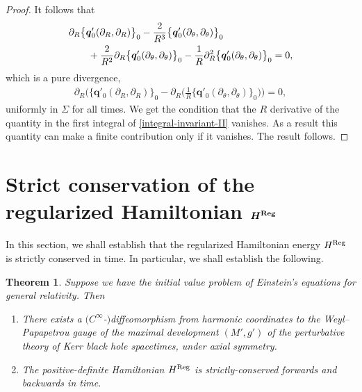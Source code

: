 \documentclass[pdftex]{sigma}
\def\ptl{\partial}%
\def\mbo#1{\boldsymbol{#1}}%
\numberwithin{equation}{section}
\newtheorem{Theorem}{Theorem}[section]
\begin{document}
\begin{proof}
It follows that
\begin{align*}
&\ptl_R \bigl\{ \mbo{q}'_0 (\ptl_R, \ptl_R) \bigr\}_0 - \frac{2}{R^3} \bigl\{ \mbo{q}'_0 (\ptl_\theta, \ptl_\theta) \bigr\}_0 \notag\\
& \qquad{} + \frac{2}{R^2} \ptl_R \bigl\{ \mbo{q}'_0 (\ptl_\theta, \ptl_\theta) \bigr\}_0 -
\frac{1}{R} \ptl^2_R \bigl\{ \mbo{q}'_0 (\ptl_\theta, \ptl_\theta) \bigr\}_0 =0,
\end{align*}
which is a pure divergence,
\begin{align*}
\ptl_R \biggl(\bigl\{ \mbo{q}'_0 (\ptl_R, \ptl_R) \bigr\}_0 - \ptl_R \biggl( \frac{1}{R} \bigl\{ \mbo{q}'_0 (\ptl_\theta, \ptl_\theta) \bigr\}_0 \biggr) \biggr) = 0,
\end{align*}
uniformly in $\Sigma$ for all times. We get the condition that the $R$ derivative of the quantity in the first integral of \eqref{integral-invariant-II} vanishes. As a result this quantity can make a finite contribution only if it vanishes. The result follows.
\end{proof}

\section{Strict conservation of the regularized Hamiltonian \texorpdfstring{$\boldsymbol{H^{{\rm Reg}}}$}{H\string^\{Reg\}}}\label{section8}

In this section, we shall establish that the regularized Hamiltonian energy $H^{{\rm Reg}}$ is strictly conserved in time. In particular, we shall establish the following.

\begin{Theorem}
	Suppose we have the initial value problem of Einstein's equations for general relativity. Then
	\begin{enumerate}\itemsep=0pt
		\item[$(1)$] There exists a $(C^\infty$-$)$diffeomorphism from harmonic coordinates to the Weyl--Papapetrou gauge of the maximal development $(M', g')$ of the perturbative theory of Kerr black hole spacetimes, under axial symmetry.
		
		\item[$(2)$] The positive-definite Hamiltonian $H^{{\rm Reg}}$ is strictly-conserved forwards and backwards in time.
	\end{enumerate}
\end{Theorem}
\end{document}
